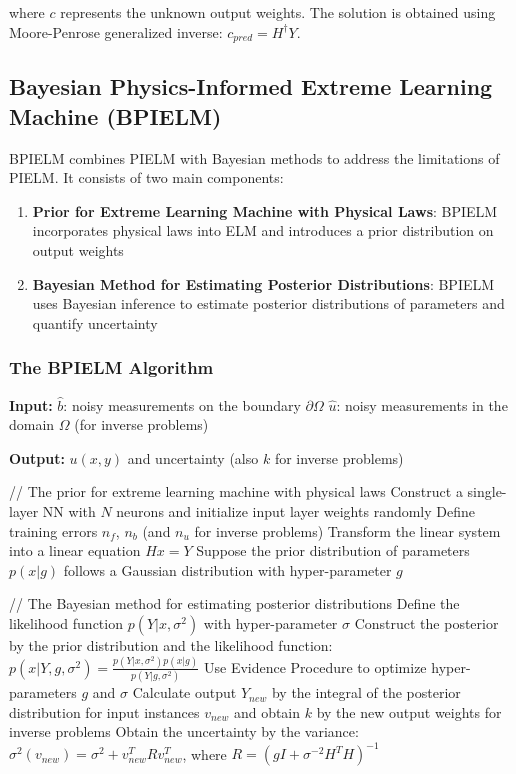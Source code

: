 \documentclass[11pt]{article}
\begin{document}
where $c$ represents the unknown output weights. The solution is obtained using Moore-Penrose generalized inverse: $c_{pred} = H^{\dagger}Y$.

\subsection{Bayesian Physics-Informed Extreme Learning Machine (BPIELM)}

BPIELM combines PIELM with Bayesian methods to address the limitations of PIELM. It consists of two main components:

\begin{enumerate}
    \item \textbf{Prior for Extreme Learning Machine with Physical Laws}: BPIELM incorporates physical laws into ELM and introduces a prior distribution on output weights
    
    \item \textbf{Bayesian Method for Estimating Posterior Distributions}: BPIELM uses Bayesian inference to estimate posterior distributions of parameters and quantify uncertainty
\end{enumerate}

\subsubsection{The BPIELM Algorithm}

\begin{algorithm}[H]
\caption{Bayesian Physics-Informed Extreme Learning Machine}
\begin{algorithmic}[1]
\STATE \textbf{Input:} 
\STATE $\hat{b}$: noisy measurements on the boundary $\partial\Omega$
\STATE $\hat{u}$: noisy measurements in the domain $\Omega$ (for inverse problems)

\STATE \textbf{Output:} $u(x,y)$ and uncertainty (also $k$ for inverse problems)

\STATE // The prior for extreme learning machine with physical laws
\STATE Construct a single-layer NN with $N$ neurons and initialize input layer weights randomly
\STATE Define training errors $n_f$, $n_b$ (and $n_u$ for inverse problems)
\STATE Transform the linear system into a linear equation $Hx = Y$
\STATE Suppose the prior distribution of parameters $p(x|g)$ follows a Gaussian distribution with hyper-parameter $g$

\STATE // The Bayesian method for estimating posterior distributions
\STATE Define the likelihood function $p(Y|x,\sigma^2)$ with hyper-parameter $\sigma$
\STATE Construct the posterior by the prior distribution and the likelihood function: $p(x|Y,g,\sigma^2) = \frac{p(Y|x,\sigma^2)p(x|g)}{p(Y|g,\sigma^2)}$
\STATE Use Evidence Procedure to optimize hyper-parameters $g$ and $\sigma$
\STATE Calculate output $Y_{new}$ by the integral of the posterior distribution for input instances $v_{new}$ and obtain $k$ by the new output weights for inverse problems
\STATE Obtain the uncertainty by the variance: $\sigma^2(v_{new}) = \sigma^2 + v_{new}^T R v_{new}^T$, where $R = (gI + \sigma^{-2}H^TH)^{-1}$
\end{algorithmic}
\end{algorithm}
\end{document}
